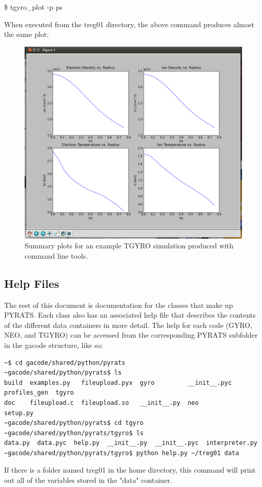 \documentclass{article}
\begin{document}
\fontfamily{\ttdefault}\selectfont

\$ tgyro\_plot -p ps

\fontfamily{\rmdefault}\selectfont

\noindent When executed from the treg01 directory, the above command produces almost the same plot:

\begin{figure}[H]
  \centering
    \includegraphics[scale=.35]{pssht2.png}
  \caption{Summary plots for an example TGYRO simulation produced with command line tools.}
\end{figure}

\subsection{Help Files}
\noindent The rest of this document is documentation for the classes that make up PYRATS.  Each class also has an associated help file that describes the contents of the different data containers in more detail.  The help for each code (GYRO, NEO, and TGYRO) can be accessed from the corresponding PYRATS subfolder in the gacode structure, like so:
\begin{verbatim}
~$ cd gacode/shared/python/pyrats
~gacode/shared/python/pyrats$ ls
build  examples.py   fileupload.pyx  gyro         __init__.pyc  profiles_gen  tgyro
doc    fileupload.c  fileupload.so   __init__.py  neo           setup.py
~gacode/shared/python/pyrats$ cd tgyro
~gacode/shared/python/pyrats/tgyro$ ls
data.py  data.pyc  help.py  __init__.py  __init__.pyc  interpreter.py
~gacode/shared/python/pyrats/tgyro$ python help.py ~/treg01 data
\end{verbatim}
\noindent If there is a folder named treg01 in the home directory, this command will print out all of the variables stored in the "data" container.
\end{document}
